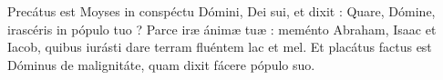 Precátus est Moyses in conspéctu Dómini, Dei sui, et dixit : Quare, Dómine, irascéris in pópulo tuo ? Parce iræ ánimæ tuæ : meménto Abraham, Isaac et Iacob, quibus iurásti dare terram fluéntem lac et mel. Et placátus factus est Dóminus de malignitáte, quam dixit fácere pópulo suo.
